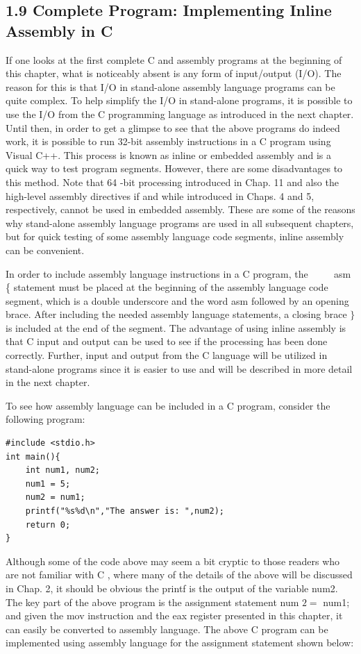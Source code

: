 \documentclass[10pt]{article}
\begin{document}
\subsection*{1.9 Complete Program: Implementing Inline Assembly in C}
If one looks at the first complete C and assembly programs at the beginning of this chapter, what is noticeably absent is any form of input/output (I/O). The reason for this is that I/O in stand-alone assembly language programs can be quite complex. To help simplify the I/O in stand-alone programs, it is possible to use the I/O from the C programming language as introduced in the next chapter. Until then, in order to get a glimpse to see that the above programs do indeed work, it is possible to run 32-bit assembly instructions in a C program using Visual C++. This process is known as inline or embedded assembly and is a quick way to test program segments. However, there are some disadvantages to this method. Note that 64 -bit processing introduced in Chap. 11 and also the high-level assembly directives if and while introduced in Chaps. 4 and 5, respectively, cannot be used in embedded assembly. These are some of the reasons why stand-alone assembly language programs are used in all subsequent chapters, but for quick testing of some assembly language code segments, inline assembly can be convenient.

In order to include assembly language instructions in a C program, the $\qquad$ asm \{ statement must be placed at the beginning of the assembly language code segment, which is a double underscore and the word asm followed by an opening brace. After including the needed assembly language statements, a closing brace $\}$ is included at the end of the segment. The advantage of using inline assembly is that C input and output can be used to see if the processing has been done correctly. Further, input and output from the C language will be utilized in stand-alone programs since it is easier to use and will be described in more detail in the next chapter.

To see how assembly language can be included in a C program, consider the following program:

\begin{verbatim}
#include <stdio.h>
int main(){
    int num1, num2;
    num1 = 5;
    num2 = num1;
    printf("%s%d\n","The answer is: ",num2);
    return 0;
}
\end{verbatim}

Although some of the code above may seem a bit cryptic to those readers who are not familiar with C , where many of the details of the above will be discussed in Chap. 2, it should be obvious the printf is the output of the variable num2. The key part of the above program is the assignment statement num $2=$ num1; and given the mov instruction and the eax register presented in this chapter, it can easily be converted to assembly language. The above C program can be implemented using assembly language for the assignment statement shown below:
\end{document}
